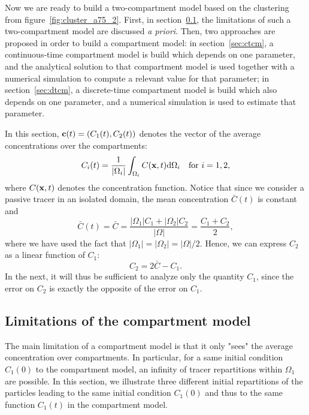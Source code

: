 Now we are ready to build a two-compartment model based on the clustering from figure~\ref{fig:cluster_a75_2}. First, in section~\ref{subsec:limitations}, the limitations of such a two-compartment model are discussed \textit{a priori}. Then, two approaches are proposed in order to build a compartment model: in section~\ref{sec:ctcm}, a continuous-time compartment model is build which depends on one parameter, and the analytical solution to that compartment model is used together with a numerical simulation to compute a relevant value for that parameter; in section~\ref{sec:dtcm}, a discrete-time compartment model is build which also depends on one parameter, and a numerical simulation is used to estimate that parameter.  

In this section, $\mathbf c(t) = (C_1(t),C_2(t))$ denotes the vector of the average concentrations over the compartments:
\begin{equation}
	C_i(t) = \frac{1}{|\Omega_i|} \int_{\Omega_i} C(\mathbf x,t) \mathrm d\Omega_i \quad \mbox{for } i = 1,2,
\end{equation}
where $C(\mathbf x,t)$ denotes the concentration function. Notice that since we consider a passive tracer in an isolated domain, the mean concentration $\bar C(t)$ is constant and
\begin{equation}
	\bar C(t) = \bar C = \frac{|\Omega_1| C_1 + |\Omega_2| C_2}{|\Omega|} = \frac{C_1 + C_2}{2},
\end{equation}
where we have used the fact that $|\Omega_1| = |\Omega_2| = |\Omega|/2$. Hence, we can express $C_2$ as a linear function of $C_1$:
\begin{equation} \label{eq:C2-C1}
	C_2 = 2\bar C - C_1.
\end{equation}
In the next, it will thus be sufficient to analyze only the quantity $C_1$, since the error on $C_2$ is exactly the opposite of the error on $C_1$.


\subsection{Limitations of the compartment model} \label{subsec:limitations}
The main limitation of a compartment model is that it only "sees" the average concentration over compartments. In particular, for a same initial condition $C_1(0)$ to the compartment model, an infinity of tracer repartitions within $\Omega_1$ are possible. In this section, we illustrate three different initial repartitions of the particles leading to the same initial condition $C_1(0)$ and thus to the same function $C_1(t)$ in the compartment model.

